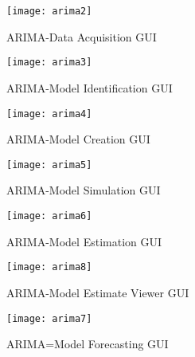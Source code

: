 
\begin{figure}[H]
\centering
\texttt{[image: arima2]}
\caption{ARIMA-Data Acquisition GUI}
\label{figApp3_1} %
\end{figure}

\begin{figure}[H]
\centering
\texttt{[image: arima3]}
\caption{ARIMA-Model Identification GUI}
\label{figApp3_2} %
\end{figure}

\begin{figure}[H]
\centering
\texttt{[image: arima4]}
\caption{ARIMA-Model Creation GUI}
\label{figApp3_3} %
\end{figure}

\begin{figure}[H]
\centering
\texttt{[image: arima5]}
\caption{ARIMA-Model Simulation GUI}
\label{figApp3_4} %
\end{figure}

\begin{figure}[H]
\centering
\texttt{[image: arima6]}
\caption{ARIMA-Model Estimation GUI}
\label{figApp3_5} %
\end{figure}

\begin{figure}[H]
\centering
\texttt{[image: arima8]}
\caption{ARIMA-Model Estimate Viewer GUI}
\label{figApp3_5} %
\end{figure}

\begin{figure}[H]
\centering
\texttt{[image: arima7]}
\caption{ARIMA=Model Forecasting GUI}
\label{figApp3_6} %
\end{figure}